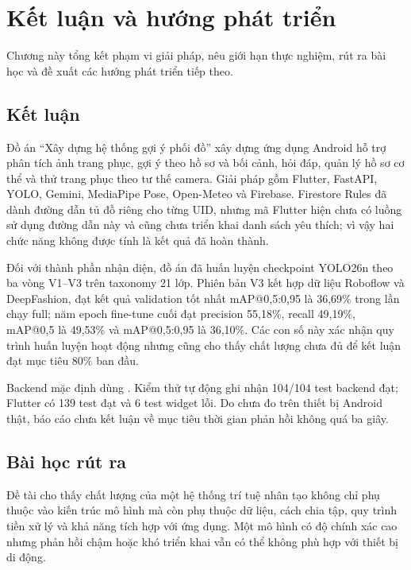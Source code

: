 \chapter{Kết luận và hướng phát triển}
\label{ch:ketluan}

\begin{muctieu}
Chương này tổng kết phạm vi giải pháp, nêu giới hạn thực nghiệm, rút ra bài
học và đề xuất các hướng phát triển tiếp theo.
\end{muctieu}

\section{Kết luận}

Đồ án ``Xây dựng hệ thống gợi ý phối đồ'' xây dựng ứng dụng Android hỗ trợ
phân tích ảnh trang phục, gợi ý theo hồ sơ và bối cảnh, hỏi đáp, quản lý hồ sơ
cơ thể và thử trang phục theo tư thế camera. Giải pháp gồm Flutter, FastAPI,
YOLO, Gemini, MediaPipe Pose, Open-Meteo và Firebase. Firestore Rules đã dành
đường dẫn tủ đồ riêng cho từng UID, nhưng mã Flutter hiện chưa có luồng sử
dụng đường dẫn này và cũng chưa triển khai danh sách yêu thích; vì vậy hai
chức năng không được tính là kết quả đã hoàn thành.

Đối với thành phần nhận diện, đồ án đã huấn luyện checkpoint YOLO26n theo ba
vòng V1--V3 trên taxonomy 21 lớp. Phiên bản V3 kết hợp dữ liệu Roboflow và
DeepFashion, đạt kết quả validation tốt nhất mAP@0,5:0,95 là 36,69\% trong
lần chạy full; năm epoch fine-tune cuối đạt precision 55,18\%, recall
49,19\%, mAP@0,5 là 49,53\% và mAP@0,5:0,95 là 36,10\%. Các con số này xác
nhận quy trình huấn luyện hoạt động nhưng cũng cho thấy chất lượng chưa đủ để
kết luận đạt mục tiêu 80\% ban đầu.

Backend mặc định dùng . Kiểm thử tự động ghi
nhận 104/104 test backend đạt; Flutter có 139 test đạt và 6 test widget lỗi.
Do chưa đo trên thiết bị Android thật, báo cáo chưa kết luận về mục tiêu thời
gian phản hồi không quá ba giây.

\section{Bài học rút ra}

Đề tài cho thấy chất lượng của một hệ thống trí tuệ nhân tạo không chỉ phụ
thuộc vào kiến trúc mô hình mà còn phụ thuộc dữ liệu, cách chia tập, quy
trình tiền xử lý và khả năng tích hợp với ứng dụng. Một mô hình có độ chính
xác cao nhưng phản hồi chậm hoặc khó triển khai vẫn có thể không phù hợp với
thiết bị di động.


